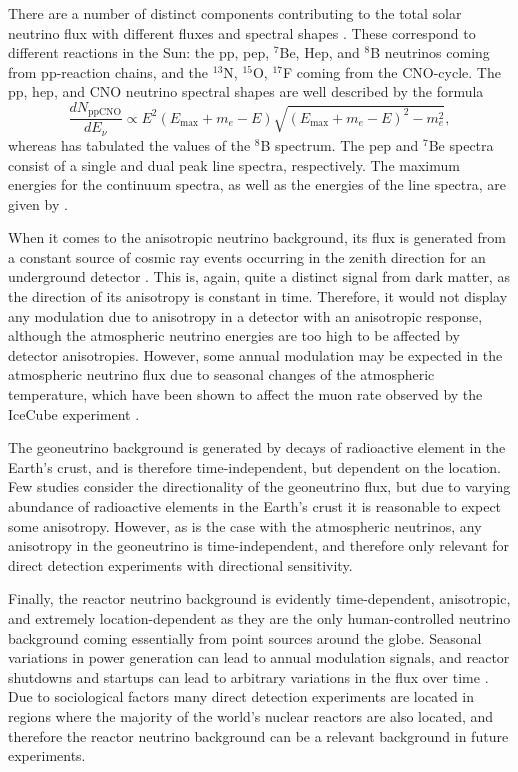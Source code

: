 \documentclass[b5paper, 10pt, twoside]{book}
\newcommand{\der}[2]{\frac{d#1}{d#2}}
\begin{document}
There are a number of distinct components contributing to the total solar neutrino flux with different fluxes and spectral shapes \parencite{VitaglianoTamborraRaffelt2020}. These correspond to different reactions in the Sun: the pp, pep, $^7$Be, Hep, and $^8$B neutrinos coming from pp-reaction chains, and the $^{13}$N, $^{15}$O, $^{17}$F coming from the CNO-cycle. The pp, hep, and CNO neutrino spectral shapes are well described by the formula
\begin{equation}
\der{N_\text{ppCNO}}{E_\nu}\propto E^2(E_\text{max}+m_e-E)\sqrt{(E_\text{max}+m_e-E)^2-m_e^2},
\end{equation}
whereas \textcite{BahcallEtAl1996} has tabulated the values of the $^8$B spectrum. The pep and $^7$Be spectra consist of a single and dual peak line spectra, respectively. The maximum energies for the continuum spectra, as well as the energies of the line spectra, are given by \textcite{Bahcall1997}.

When it comes to the anisotropic neutrino background, its flux is generated from a constant source of cosmic ray events occurring in the zenith direction for an underground detector \parencite{GaisserHonda2002}. This is, again, quite a distinct signal from dark matter, as the direction of its anisotropy is constant in time. Therefore, it would not display any modulation due to anisotropy in a detector with an anisotropic response, although the atmospheric neutrino energies are too high to be affected by detector anisotropies. However, some annual modulation may be expected in the atmospheric neutrino flux due to seasonal changes of the atmospheric temperature, which have been shown to affect the muon rate observed by the IceCube experiment \parencite{SerapEtAl2010}.

The geoneutrino background is generated by decays of radioactive element in the Earth's crust, and is therefore time-independent, but dependent on the location. Few studies consider the directionality of the geoneutrino flux, but due to varying abundance of radioactive elements in the Earth's crust it is reasonable to expect some anisotropy. However, as is the case with the atmospheric neutrinos, any anisotropy in the geoneutrino is time-independent, and therefore only relevant for direct detection experiments with directional sensitivity.

Finally, the reactor neutrino background is evidently time-dependent, anisotropic, and extremely location-dependent as they are the only human-controlled neutrino background coming essentially from point sources around the globe. Seasonal variations in power generation can lead to annual modulation signals, and reactor shutdowns and startups can lead to arbitrary variations in the flux over time \parencite{Baldoncini2015}. Due to sociological factors many direct detection experiments are located in regions where the majority of the world's nuclear reactors are also located, and therefore the reactor neutrino background can be a relevant background in future experiments.
\end{document}
